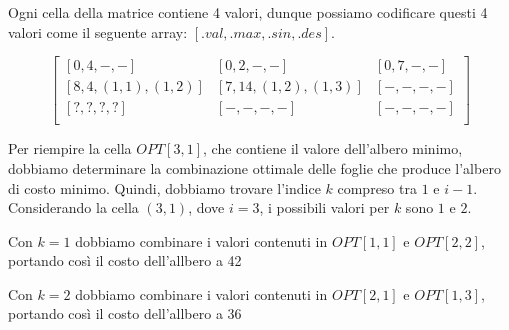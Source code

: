 Ogni cella della matrice contiene 4 valori, dunque possiamo codificare questi 4 valori come 
il seguente array: $[.val, .max, .sin, .des]$.

\[
	\begin{bmatrix}
		[0, 4, -, -]           & [0, 2, -, -]            & [0, 7, -, -] \\
		[8, 4, (1, 1), (1, 2)] & [7, 14, (1, 2), (1, 3)] & [-, -, -, -] \\
		[?, ?, ?, ?]           & [-, -, -, -]            & [-, -, -, -] \\
	\end{bmatrix}
\]

Per riempire la cella $OPT[3, 1]$, che contiene il valore dell'albero minimo, 
dobbiamo determinare la combinazione ottimale delle foglie che produce l'albero di costo minimo. 
Quindi, dobbiamo trovare l'indice $k$ compreso tra $1$ e $i - 1$. Considerando la cella $(3, 1)$, 
dove $i = 3$, i possibili valori per $k$ sono $1$ e $2$.


\begin{center}
	\begin{enumerate*}[label={}]
	\item {
	}
	\newline
	\item{
	      Con $k = 1$ dobbiamo combinare i valori contenuti in $OPT[1,1]$ e $OPT[2,2]$, portando così il costo dell'allbero a 42
	}
\end{enumerate*}
\end{center}


\begin{center}	
\begin{enumerate*}[label={}]
	\item {
	}
	\newline
	\item{
		Con $k = 2$ dobbiamo combinare i valori contenuti in $OPT[2,1]$ e $OPT[1,3]$, portando così il costo dell'allbero a 36
	}
\end{enumerate*}
\end{center}


